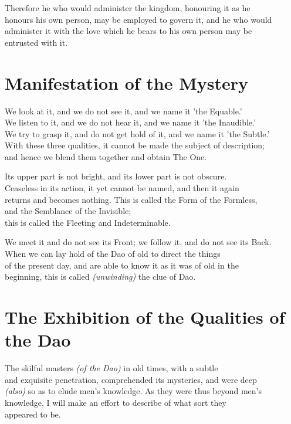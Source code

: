     Therefore he who would administer the kingdom, honouring it as he\\
    honours his own person, may be employed to govern it, and he who would\\
    administer it with the love which he bears to his own person may be\\
    entrusted with it.\vspace{\baselineskip}
    
\section*{Manifestation of the Mystery}
    We look at it, and we do not see it, and we name it 'the Equable.'\\
    We listen to it, and we do not hear it, and we name it 'the Inaudible.'\\
    We try to grasp it, and do not get hold of it, and we name it 'the Subtle.'\\
    With these three qualities, it cannot be made the subject of description;\\
    and hence we blend them together and obtain The One.\vspace{\baselineskip}
    
    Its upper part is not bright, and its lower part is not obscure.\\
    Ceaseless in its action, it yet cannot be named, and then it again\\
    returns and becomes nothing. This is called the Form of the Formless,\\
    and the Semblance of the Invisible;\\
    this is called the Fleeting and Indeterminable.\vspace{\baselineskip}
    
    We meet it and do not see its Front; we follow it, and do not see its Back.\\
    When we can lay hold of the Dao of old to direct the things\\
    of the present day, and are able to know it as it was of old in the\\
    beginning, this is called \textit{(unwinding)} the clue of Dao.\vspace{\baselineskip}
    
\section*{The Exhibition of the Qualities of the Dao}
    The skilful masters \textit{(of the Dao)} in old times, with a subtle\\
    and exquisite penetration, comprehended its mysteries, and were deep\\
    \textit{(also)} so as to elude men's knowledge. As they were thus beyond men's\\
    knowledge, I will make an effort to describe of what sort they\\
    appeared to be.\vspace{\baselineskip}
    

